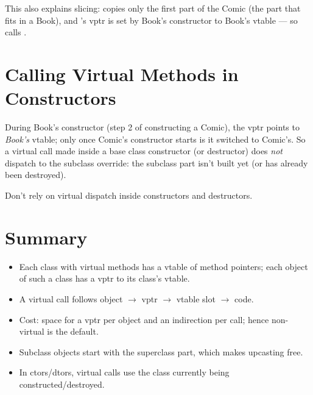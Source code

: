 This also explains slicing:  copies only the first part of
the Comic (the part that fits in a Book), and 's vptr is set by Book's
constructor to Book's vtable --- so  calls
.

\section{Calling Virtual Methods in Constructors}
During Book's constructor (step 2 of constructing a Comic), the vptr points to
\emph{Book's} vtable; only once Comic's constructor starts is it switched to
Comic's. So a virtual call made inside a base class constructor (or destructor)
does \emph{not} dispatch to the subclass override: the subclass part isn't built
yet (or has already been destroyed).
\begin{center}
\end{center}
\begin{important}[Rule]
Don't rely on virtual dispatch inside constructors and destructors.
\end{important}

\section*{Summary}
\begin{itemize}
  \item Each class with virtual methods has a vtable of method pointers; each
        object of such a class has a vptr to its class's vtable.
  \item A virtual call follows object $\to$ vptr $\to$ vtable slot $\to$ code.
  \item Cost: space for a vptr per object and an indirection per call; hence
        non-virtual is the default.
  \item Subclass objects start with the superclass part, which makes upcasting
        free.
  \item In ctors/dtors, virtual calls use the class currently being
        constructed/destroyed.
\end{itemize}
